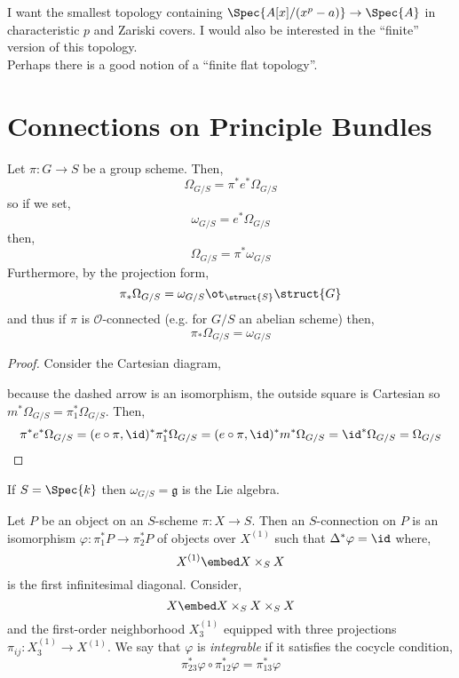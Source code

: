 \documentclass[12pt]{article}
\begin{document}
I want the smallest topology containing $\Spec{A[x]/(x^p - a)} \to \Spec{A}$ in characteristic $p$ and Zariski covers. I would also be interested in the ``finite'' version of this topology.
\bigskip\\
Perhaps there is a good notion of a ``finite flat topology''. 


\section{Connections on Principle Bundles}

\newcommand{\ad}{\mathrm{ad}}
\newcommand{\g}{\mathfrak{g}}
\newcommand{\cO}{\mathcal{O}}

\begin{prop}
Let $\pi : G \to S$ be a group scheme. Then,
\[ \Omega_{G/S} = \pi^* e^* \Omega_{G/S} \]
so if we set,
\[ \omega_{G/S} = e^* \Omega_{G/S} \]
then,
\[ \Omega_{G/S} = \pi^* \omega_{G/S} \]
Furthermore, by the projection form,
\[ \pi_* \Omega_{G/S} = \omega_{G/S} \ot_{\struct{S}} \struct{G} \]
and thus if $\pi$ is $\cO$-connected (e.g. for $G / S$ an abelian scheme) then,
\[ \pi_* \Omega_{G/S} = \omega_{G/S} \]
\end{prop}

\begin{proof}
Consider the Cartesian diagram,
\begin{center}
\end{center}
because the dashed arrow is an isomorphism, the outside square is Cartesian so $m^* \Omega_{G/S} = \pi_1^* \Omega_{G/S}$. Then,
\[ \pi^* e^* \Omega_{G/S} = (e \circ \pi, \id)^* \pi_1^* \Omega_{G/S} = (e \circ \pi, \id)^* m^* \Omega_{G/S} = \id^* \Omega_{G/S} = \Omega_{G/S} \]
\end{proof}

\begin{rmk}
If $S = \Spec{k}$ then $\omega_{G/S} = \g$ is the Lie algebra. 
\end{rmk}

\begin{defn}
Let $P$ be an object on an $S$-scheme $\pi : X \to S$. Then an $S$-connection on $P$ is an isomorphism $\varphi : \pi_1^* P \to \pi_2^* P$ of objects over $X^{(1)}$ such that $\Delta^* \varphi = \id$ where,
\[ X^{(1)} \embed X \times_S X \]
is the first infinitesimal diagonal. Consider,
\[ X \embed X \times_S X \times_S X \]  
and the first-order neighborhood $X^{(1)}_3$ equipped with three projections $\pi_{ij} : X^{(1)}_3 \to X^{(1)}$. We say that $\varphi$ is \textit{integrable} if it satisfies the cocycle condition,
\[ \pi_{23}^* \varphi \circ \pi_{12}^* \varphi = \pi_{13}^* \varphi \] 
\end{defn}
\end{document}
